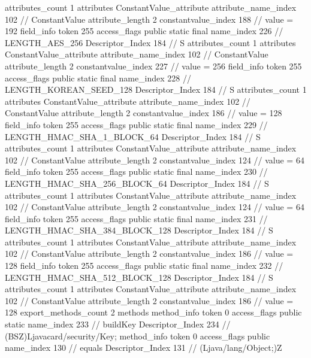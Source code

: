 {{{{{				attributes_count	1
				attributes {
				ConstantValue_attribute {
					attribute_name_index	102		// ConstantValue
					attribute_length	2
					constantvalue_index	188		// value = 192
				}
				}
			}
			field_info {
				token	255
				access_flags	public static final
				name_index	226		// LENGTH_AES_256
				Descriptor_Index	184		// S
				attributes_count	1
				attributes {
				ConstantValue_attribute {
					attribute_name_index	102		// ConstantValue
					attribute_length	2
					constantvalue_index	227		// value = 256
				}
				}
			}
			field_info {
				token	255
				access_flags	public static final
				name_index	228		// LENGTH_KOREAN_SEED_128
				Descriptor_Index	184		// S
				attributes_count	1
				attributes {
				ConstantValue_attribute {
					attribute_name_index	102		// ConstantValue
					attribute_length	2
					constantvalue_index	186		// value = 128
				}
				}
			}
			field_info {
				token	255
				access_flags	public static final
				name_index	229		// LENGTH_HMAC_SHA_1_BLOCK_64
				Descriptor_Index	184		// S
				attributes_count	1
				attributes {
				ConstantValue_attribute {
					attribute_name_index	102		// ConstantValue
					attribute_length	2
					constantvalue_index	124		// value = 64
				}
				}
			}
			field_info {
				token	255
				access_flags	public static final
				name_index	230		// LENGTH_HMAC_SHA_256_BLOCK_64
				Descriptor_Index	184		// S
				attributes_count	1
				attributes {
				ConstantValue_attribute {
					attribute_name_index	102		// ConstantValue
					attribute_length	2
					constantvalue_index	124		// value = 64
				}
				}
			}
			field_info {
				token	255
				access_flags	public static final
				name_index	231		// LENGTH_HMAC_SHA_384_BLOCK_128
				Descriptor_Index	184		// S
				attributes_count	1
				attributes {
				ConstantValue_attribute {
					attribute_name_index	102		// ConstantValue
					attribute_length	2
					constantvalue_index	186		// value = 128
				}
				}
			}
			field_info {
				token	255
				access_flags	public static final
				name_index	232		// LENGTH_HMAC_SHA_512_BLOCK_128
				Descriptor_Index	184		// S
				attributes_count	1
				attributes {
				ConstantValue_attribute {
					attribute_name_index	102		// ConstantValue
					attribute_length	2
					constantvalue_index	186		// value = 128
				}
				}
			}
			}
			export_methods_count	2
			methods {
				method_info {
					token	0
					access_flags	public static
					name_index	233		// buildKey
					Descriptor_Index	234		// (BSZ)Ljavacard/security/Key;
				}
				method_info {
					token	0
					access_flags	public
					name_index	130		// equals
					Descriptor_Index	131		// (Ljava/lang/Object;)Z
}}}}}
